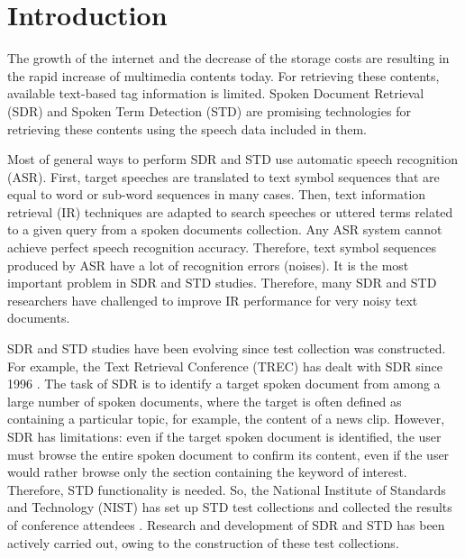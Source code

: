 \documentclass[english]{jnlp_1.4}
\begin{document}
\maketitle

\section{Introduction} \label{sec:intro}

The growth of the internet and the decrease of the storage costs are
resulting in the rapid increase of multimedia contents today. 
For retrieving these contents, available text-based tag information is
limited. 
Spoken Document Retrieval (SDR) and Spoken Term Detection (STD) are
promising technologies for retrieving these contents using the speech
data included in them. 

Most of general ways to perform SDR and STD use automatic speech
recognition (ASR). First, target speeches are translated to text symbol
sequences that are equal to word or sub-word sequences in many cases. 
Then, text information retrieval (IR) techniques are adapted to search
speeches or uttered terms related to a given query from a spoken
documents collection.
Any ASR system cannot achieve perfect speech recognition accuracy. 
Therefore, text symbol
sequences produced by ASR have a lot of recognition errors (noises). 
It is the most important problem in SDR and STD studies.
Therefore, many SDR and STD researchers have challenged to improve IR
performance for very noisy text documents.

SDR and STD studies have been evolving since test collection was
constructed. For example, the Text Retrieval Conference (TREC) has dealt
with SDR since 1996 \cite{TREC}. 
The task of SDR is to identify a target spoken document from among a
large number of spoken documents, where the target is often defined as
containing a particular topic, for example, the content of a news clip. 
However, SDR has limitations: even if the target spoken document is
identified, the user must browse the entire spoken document to confirm 
its content, even if the user would rather browse only the section
containing the keyword of interest. 
Therefore, STD functionality is needed. 
So, the National Institute of Standards and Technology (NIST) has set up 
STD test collections and collected the results of conference
attendees \cite{NIST}. 
Research and development of SDR and STD has been actively
carried out, owing to the construction of these test collections. 
\end{document}
